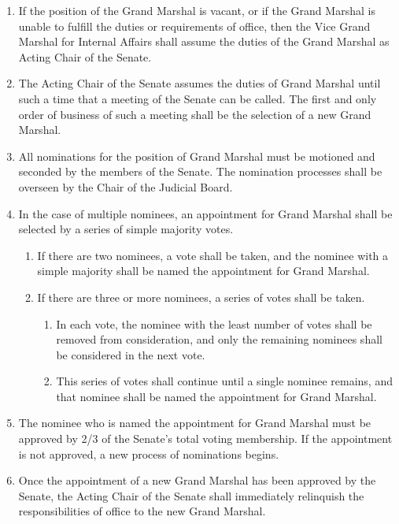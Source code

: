 
\begin{enumerate}
\item If the position of the Grand Marshal is vacant, or if the Grand Marshal is unable to fulfill the duties or requirements of office, then the Vice Grand Marshal for Internal Affairs shall assume the duties of the Grand Marshal as Acting Chair of the Senate.
\item The Acting Chair of the Senate assumes the duties of Grand Marshal until such a time that a meeting of the Senate can be called. The first and only order of business of such a meeting shall be the selection of a new Grand Marshal.
\item All nominations for the position of Grand Marshal must be motioned and seconded by the members of the Senate. The nomination processes shall be overseen by the Chair of the Judicial Board.
\item In the case of multiple nominees, an appointment for Grand Marshal shall be selected by a series of simple majority votes.
  \begin{enumerate}
  \item If there are two nominees, a vote shall be taken, and the nominee with a simple majority shall be named the appointment for Grand Marshal.
  \item If there are three or more nominees, a series of votes shall be taken.
    \begin{enumerate}
    \item In each vote, the nominee with the least number of votes shall be removed from consideration, and only the remaining nominees shall be considered in the next vote.
    \item This series of votes shall continue until a single nominee remains, and that nominee shall be named the appointment for Grand Marshal.
    \end{enumerate}
  \end{enumerate}
\item The nominee who is named the appointment for Grand Marshal must be approved by 2/3 of the Senate’s total voting membership. If the appointment is not approved, a new process of nominations begins.
\item Once the appointment of a new Grand Marshal has been approved by the Senate, the Acting Chair of the Senate shall immediately relinquish the responsibilities of office to the new Grand Marshal.
\end{enumerate}

